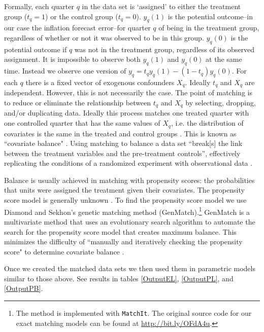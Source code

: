 \documentclass[a4paper]{article}\usepackage[]{graphicx}\usepackage[]{color}
\begin{document}
Formally, each quarter $q$ in the data set is `assigned' to either the treatment group ($t_{q} = 1$) or the control group ($t_{q} = 0$). $y_{q}(1)$ is the potential outcome--in our case the inflation forecast error--for quarter $q$ of being in the treatment group, regardless of whether or not it was observed to be in this group. $y_{q}(0)$ is the potential outcome if $q$ was not in the treatment group, regardless of its observed assignment. It is impossible to observe both $y_{q}(1)$ and $y_{q}(0)$ at the same time. Instead we observe one version of $y_{q}=t_{q}y_{q}(1)-(1-t_{q})y_q(0)$. For each $q$ there is a fixed vector of exogenous confounders $X_{q}$. Ideally $t_{q}$ and $X_{q}$ are independent. However, this is not necessarily the case. The point of matching is to reduce or eliminate the relationship between $t_{q}$  and $X_{q}$ by selecting, dropping, and/or duplicating data. Ideally this process matches one treated quarter with one controlled quarter that has the same values of $X_{q}$, i.e. the distribution of covariates is the same in the treated and control groups \citep{matchit2011}. This is known as ``covariate balance" \cite[1]{Diamond2012}. Using matching to balance a data set ``break[s] the link between the treatment variables and the pre-treatment controls'', effectively replicating the conditions of a randomized experiment with observational data \cite[][2--3]{matchit2011}. 

Balance is usually achieved in matching with propensity scores: the probabilities that units were assigned the treatment given their covariates. The propensity score model is generally unknown \citep{Drake1993}. To find the propensity score model we use Diamond and Sekhon's \citeyearpar{Diamond2012} genetic matching method (GenMatch).\footnote{The method is implemented with {\tt{MatchIt}}. The original source code for our exact matching models can be found at {\url{http://bit.ly/OFdA4u}}.} GenMatch is a multivariate method that uses an evolutionary search algorithm to automate the search for the propensity score model that creates maximum balance. This minimizes the difficulty of ``manually and iteratively checking the propensity score" to determine covariate balance \citep[][2]{Diamond2012}. 

Once we created the matched data sets we then used them in parametric models similar to those above. See results in tables \ref{OutputEL}, \ref{OutputPL}, and \ref{OutputPB}. 
\end{document}
